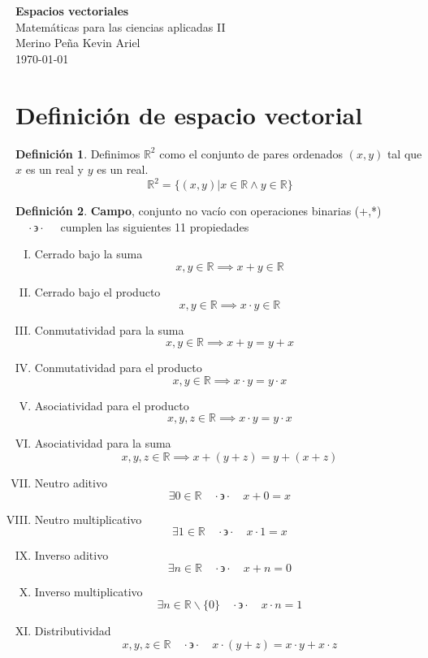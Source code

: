 \documentclass[letterpaper]{article}
\newcommand{\tq}{ \quad \cdot  \backepsilon \cdot \quad }
\newcommand{\R}{\mathds{R}}
\renewcommand{\*}{\cdot}
\theoremstyle{definition}
\newtheorem{definition}{Definición}[section]
\begin{document}
		\begin{titlepage}
		\begin{center}
			\Large{\textbf{Espacios vectoriales}} \\[0.1cm]
			\huge{Matemáticas para las ciencias aplicadas II}\\[0.2cm]
			\large{Merino Peña Kevin Ariel }\\
			\today
		\end{center}
		\let\newpage\relax%
		\hrulefill
	\end{titlepage}
	\section{Definición de espacio vectorial}
	\begin{definition}
		Definimos $ \R^2 $ como el conjunto de pares ordenados $ (x,y) $ tal que $ x $ es un real y $ y $ es un real.
		\[ \R^2 = \{(x,y) | x \in \R \land y \in \R \} \]
	\end{definition}
	\begin{definition}
		\textbf{Campo}, conjunto no vacío con operaciones binarias (+,*) 
		$ \tq $ cumplen las siguientes 11 propiedades
		\begin{enumerate}[(I)]
			\item Cerrado bajo la suma
			\[x,y \in \R \implies x + y \in \R \]
			\item  Cerrado bajo el producto
			\[  x,y \in \R \implies x\cdot y \in \R \]
			\item Conmutatividad para la suma
			\[  x,y \in \R \implies x + y = y + x\]
			\item Conmutatividad para el producto
			\[  x,y \in \R \implies x \cdot y  = y\cdot x \]
			\item Asociatividad para el producto
			\[  x,y,z \in \R \implies x\* y = y \* x \]
			\item Asociatividad para la suma
			\[  x,y,z  \in \R \implies x +(y+z) = y + (x +z)  \]
			\item Neutro aditivo
			\[ \exists 0 \in \R \tq x + 0 = x \]
			\item Neutro multiplicativo
			\[ \exists 1 \in \R \tq x \* 1 = x  \]
			\item Inverso aditivo
			\[ \exists n  \in \R \tq x + n = 0  \]
			\item Inverso multiplicativo
			\[ \exists n \in \R \backslash \{0\} \tq x\* n = 1 \]
			\item Distributividad
			\[ x,y,z \in \R \tq x \*(y+z) = x\* y + x \* z  \]
		\end{enumerate}
	\end{definition}
\end{document}
